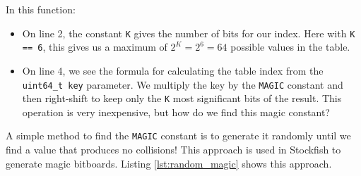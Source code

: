 \documentclass[12pt,a4paper,twoside,openright]{book}
\begin{document}
In this function:

\begin{itemize}

\item On line 2, the constant \texttt{K} gives the number of bits for our index. Here with \texttt{K == 6}, this gives us a maximum of $2^K = 2^6 = 64$ possible values in the table.

\item On line 4, we see the formula for calculating the table index from the \texttt{uint64_t key} parameter. We multiply the key by the \texttt{MAGIC} constant and then right-shift to keep only the \texttt{K} most significant bits of the result. This operation is very inexpensive, but how do we find this magic constant?\\

\end{itemize}

A simple method to find the \texttt{MAGIC} constant is to generate it randomly until we find a value that produces no collisions! This approach is used in Stockfish \cite{stockfish2025} to generate magic bitboards. Listing \ref{lst:random_magic} shows this approach.
\end{document}
